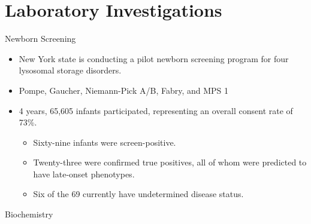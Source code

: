 \documentclass[presentation, smaller]{beamer}
\begin{document}
\section{Laboratory Investigations}
\label{sec:orgheadline17}
\begin{frame}[label={sec:orgheadline15}]{Newborn Screening}
\begin{itemize}
\item New York state is conducting a pilot newborn screening program for four lysosomal storage disorders.
\item Pompe, Gaucher, Niemann-Pick A/B, Fabry, and MPS 1

\item 4 years, 65,605 infants participated, representing an overall consent rate of 73\%.
\begin{itemize}
\item Sixty-nine infants were screen-positive.
\item Twenty-three were confirmed true positives, all of whom were predicted to have late-onset phenotypes.
\item Six of the 69 currently have undetermined disease status.
\end{itemize}
\end{itemize}
\end{frame}

\begin{frame}[label={sec:orgheadline16}]{Biochemistry}
\end{frame}
\end{document}
